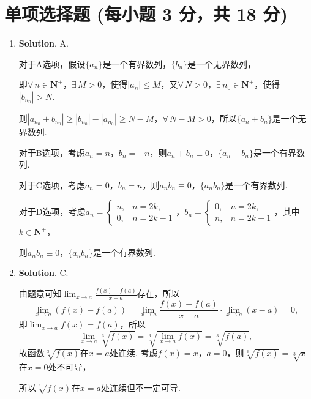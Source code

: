 \documentclass[../main.tex]{subfiles}
\begin{document}
\section{单项选择题 (每小题 3 分，共 18 分)}
\begin{enumerate}
    \item \textbf{Solution}. A.

          对于A选项，假设$\{a_{n}\}$是一个有界数列，$\{b_{n}\}$是一个无界数列，

          即$\forall\,n\in\mathbf{N}^{+}$，$\exists\,M>0$，使得$|a_{n}|\leq M$，又$\forall
              \,N>0$，$\exists\,n_{0}\in\mathbf{N}^{+}$，使得$|b_{n_0}|>N$.

          则$|a_{n_0}+b_{n_0}|\geq |b_{n_0}|-|a_{n_0}|\geq N-M$，$\forall\,N-M>0$，所以$\{
              a_{n}+b_{n}\}$是一个无界数列.

          对于B选项，考虑$a_{n}= n$，$b_{n}=-n$，则$a_{n}+b_{n}\equiv 0$，$\{a_{n}+b_{n}
              \}$是一个有界数列.

          对于C选项，考虑$a_{n}=0$，$b_{n}=n$，则$a_{n}b_{n}\equiv 0$，$\{a_{n}b_{n}\}$是一个有界数列.

          对于D选项，考虑$a_{n}=
              \begin{cases}
                  n, & n=2k,  \\
                  0, & n=2k-1
              \end{cases}$，$b_{n}=
              \begin{cases}
                  0, & n=2k,  \\
                  n, & n=2k-1
              \end{cases}$，其中$k\in\mathbf{N}^{+}$，

          则$a_{n}b_{n}\equiv 0$，$\{a_{n}b_{n}\}$是一个有界数列.

    \item \textbf{Solution}. C.

          由题意可知$\lim_{x\to a}\frac{f(x)-f(a)}{x-a}$存在，所以
          \[
              \lim_{x\to a}\left
              (f(x)-f(a)\right)=\lim_{x\to a}\frac{f(x)-f(a)}{x-a}\cdot \lim_{x\to a}(x-a
              )=0,
          \]
          即$\lim_{x\to a}f(x)=f(a)$，所以
          \[
              \lim_{x\to a}\sqrt[3]{f(x)}=\sqrt[3]{\lim_{x\to
                      a}f(x)}=\sqrt[3]{f(a)},
          \]
          故函数$\sqrt[3]{f(x)}$在$x=a$处连续. 考虑$f(x)=x$，$a=0$，则$\sqrt[3]{f(x)}=\sqrt[3]{x}$在$x=0$处不可导，

          所以$\sqrt[3]{f(x)}$在$x=a$处连续但不一定可导.


\end{enumerate}
\end{document}
